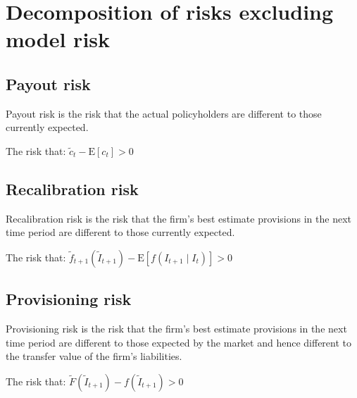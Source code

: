\section{Decomposition of risks excluding model risk}


\subsection{Payout risk}
Payout risk is the risk that the actual policyholders are different to those currently expected.

\begin{definition}
The risk that: $ \tilde{c}_t - \mathrm{E} \left[ c_t \right] > 0 $
\end{definition}


\subsection{Recalibration risk}
Recalibration risk is the risk that the firm's best estimate provisions in the next time period are different to those currently expected.

\begin{definition}
The risk that: $ \tilde{f}_{t+1} \left( \tilde{I}_{t+1} \right) - \mathrm{E} \left[ f \left( I_{t+1} \mid I_t \right) \right] > 0 $
\end{definition}


\subsection{Provisioning risk}
Provisioning risk is the risk that the firm's best estimate provisions in the next time period are different to those expected by the market and hence different to the transfer value of the firm's liabilities.

\begin{definition}
The risk that: $ \tilde{F} \left( \tilde{I}_{t+1} \right) - f \left( \tilde{I}_{t+1} \right) > 0 $
\end{definition}